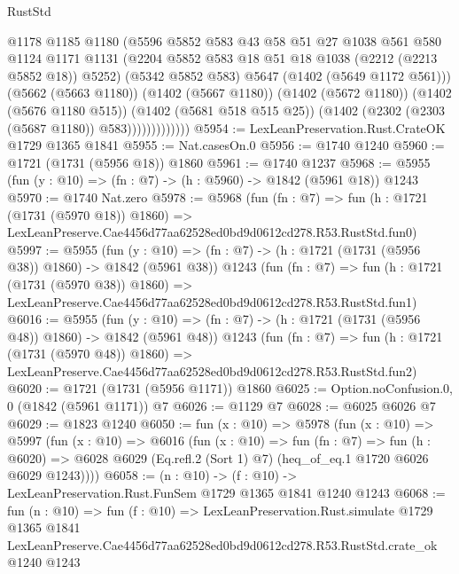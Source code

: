 \begin{lexlean}{RustStd}
\begin{coremodule}
                          @1178
                          @1185
                          @1180
                          (@5596
                            @5852
                            @583
                            @43
                            @58
                            @51
                            @27
                            @1038
                            @561
                            @580
                            @1124
                            @1171
                            @1131
                            (@2204 @5852 @583 @18 @51 @18 @1038 (@2212 (@2213 @5852 @18)) @5252)
                            (@5342 @5852 @583)
                            @5647
                            (@1402 (@5649 @1172 @561)))
                          (@5662 (@5663 @1180))
                          (@1402 (@5667 @1180))
                          (@1402 (@5672 @1180))
                          (@1402 (@5676 @1180 @515))
                          (@1402 (@5681 @518 @515 @25))
                          (@1402 (@2302 (@2303 (@5687 @1180)) @583)))))))))))))
@5954 := LexLeanPreservation.Rust.CrateOK @1729 @1365 @1841
@5955 := Nat.casesOn.{0}
@5956 := @1740 @1240
@5960 := @1721 (@1731 (@5956 @18)) @1860
@5961 := @1740 @1237
@5968 := @5955 (fun (y : @10) => (fn : @7) -> (h : @5960) -> @1842 (@5961 @18)) @1243
@5970 := @1740 Nat.zero
@5978 := @5968
    (fun (fn : @7) =>
    fun (h : @1721 (@1731 (@5970 @18)) @1860) =>
    LexLeanPreserve.Cae4456d77aa62528ed0bd9d0612cd278.R53.RustStd.fun0)
@5997 := @5955
    (fun (y : @10) => (fn : @7) -> (h : @1721 (@1731 (@5956 @38)) @1860) -> @1842 (@5961 @38))
    @1243
    (fun (fn : @7) =>
    fun (h : @1721 (@1731 (@5970 @38)) @1860) =>
    LexLeanPreserve.Cae4456d77aa62528ed0bd9d0612cd278.R53.RustStd.fun1)
@6016 := @5955
    (fun (y : @10) => (fn : @7) -> (h : @1721 (@1731 (@5956 @48)) @1860) -> @1842 (@5961 @48))
    @1243
    (fun (fn : @7) =>
    fun (h : @1721 (@1731 (@5970 @48)) @1860) =>
    LexLeanPreserve.Cae4456d77aa62528ed0bd9d0612cd278.R53.RustStd.fun2)
@6020 := @1721 (@1731 (@5956 @1171)) @1860
@6025 := Option.noConfusion.{0, 0} (@1842 (@5961 @1171)) @7
@6026 := @1129 @7
@6028 := @6025 @6026 @7
@6029 := @1823 @1240
@6050 := fun (x : @10) =>
  @5978
    (fun (x : @10) =>
    @5997
      (fun (x : @10) =>
      @6016
        (fun (x : @10) =>
        fun (fn : @7) =>
        fun (h : @6020) =>
        @6028 @6029 (Eq.refl.{2} (Sort 1) @7) (heq_of_eq.{1} @1720 @6026 @6029 @1243))))
@6058 := (n : @10) -> (f : @10) -> LexLeanPreservation.Rust.FunSem @1729 @1365 @1841 @1240 @1243
@6068 := fun (n : @10) =>
  fun (f : @10) =>
  LexLeanPreservation.Rust.simulate
    @1729
    @1365
    @1841
    LexLeanPreserve.Cae4456d77aa62528ed0bd9d0612cd278.R53.RustStd.crate_ok
    @1240
    @1243
\end{coremodule}
\end{lexlean}
